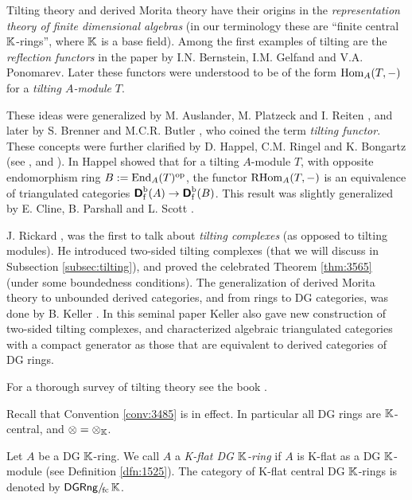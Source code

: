 \begin{rem} \label{rem:3436}
Tilting theory and derived Morita theory have their origins in the 
{\em representation theory of finite dimensional algebras} (in our terminology 
these are ``finite central $\mathbb{K}$-rings'', where $\mathbb{K}$ is a base field). Among the 
first examples of tilting are the {\em reflection functors} in the paper
\cite{BeGePo} by I.N. Bernstein, I.M. Gelfand and V.A. Ponomarev. Later these 
functors were understood to be of the form $\operatorname{Hom}_{A}(T, -)$ for a {\em 
tilting $A$-module} $T$. 

These ideas were generalized by M. Auslander, M. Platzeck and I. Reiten 
\cite{AuPlRe}, and later by S. Brenner and M.C.R. Butler \cite{BrnBu}, who 
coined the term {\em tilting functor}. 
These concepts were further clarified by  D. Happel, C.M. Ringel and 
K. Bongartz (see \cite{Hap0}, \cite{Hap} and \cite{HapRi}). In \cite{Hap0} 
Happel showed that for a tilting $A$-module $T$, 
with opposite endomorphism ring $B := \operatorname{End}_{A}(T)^{\mathrm{op}}$, 
the functor $\operatorname{RHom}_{A}(T,-)$ is an equivalence of triangulated categories 
$\boldsymbol{\mathsf{D}}_{\mathrm{f}}^{\mathrm{b}}(A) \to \boldsymbol{\mathsf{D}}_{\mathrm{f}}^{\mathrm{b}}(B)$.  
This result was slightly generalized by E. Cline, B. Parshall and L. Scott
\cite{ClPaSc}. 

J. Rickard \cite{Ric1}, \cite{Ric2} was the first to talk about {\em tilting 
complexes} (as opposed to tilting modules). He introduced two-sided tilting 
complexes (that we will discuss in Subsection \ref{subsec:tilting}), and proved 
the celebrated Theorem \ref{thm:3565} (under some boundedness conditions). The 
generalization of derived Morita theory to unbounded derived categories, 
and from rings to DG categories, was done by B. Keller \cite{Kel1}.
In this seminal paper Keller also gave new construction of two-sided 
tilting complexes,  and characterized algebraic triangulated categories with a 
compact generator as those that are equivalent to derived categories of DG 
rings. 

For a thorough survey of tilting theory see the book \cite{AnHaKr}.
\end{rem}





 \label{subsec:flat-dg-rng}

Recall that Convention \ref{conv:3485} is in effect.
In particular all DG rings are $\mathbb{K}$-central, and 
$\otimes = \otimes_{\mathbb{K}}$.

\begin{dfn} \label{dfn:3560}
Let $A$ be a DG $\mathbb{K}$-ring. We call $A$ a {\em K-flat DG $\mathbb{K}$-ring} 
if $A$ is K-flat as a DG $\mathbb{K}$-module (see Definition \ref{dfn:1525}). 
The category of K-flat central DG $\mathbb{K}$-rings is denoted by 
$\mathrm{\mathsf{DGRng}} /_{\! \mathrm{fc}}\, \mathbb{K}$. 
\end{dfn}

